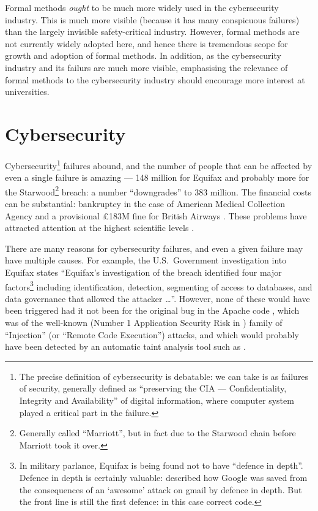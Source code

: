 \documentclass{llncs}
\begin{document}
Formal methods \emph{ought} to be much more widely used in the cybersecurity industry.  This is much more visible (because it has many conspicuous failures) than the largely invisible safety-critical industry. However, formal methods are not currently widely adopted here, and hence there is tremendous scope for growth and adoption of formal methods.
In addition, as the cybersecurity industry and its failurs are much more visible, emphasising the relevance of formal methods to the cybersecurity industry should encourage more interest at universities.

\section{Cybersecurity}
Cybersecurity\footnote{The precise definition of cybersecurity is debatable: we can take is as failures of security, generally defined as ``preserving the CIA --- Confidentiality, Integrity and Availability'' of digital information, where computer system played a critical part in the failure.} failures abound, and the number of people that can be affected by even a single failure is amazing --- 148 million for Equifax \cite{Bloomberg2018b} and probably more for the Starwood\footnote{Generally called ``Marriott'', but in fact due to the Starwood chain before Marriott took it over.} breach: %
a number \cite{Irwin2019b} ``downgrades'' to 383 million.  The financial costs can be substantial: bankruptcy in the case of American Medical Collection Agency \cite{Ford2019b} and a provisional \pounds183M fine for British Airways \cite{Guardian2019i}.  These problems have attracted attention at the highest scientific levels \cite{RoyalSociety2016a}.
\par
There are many reasons for cybersecurity failures, and even a given failure may have multiple causes. For example, the U.S.~Government investigation \cite{GAO2018a} into Equifax states ``Equifax's investigation of the breach identified four major factors\footnote{In military parlance, Equifax is being found not to have ``defence in depth''. Defence in depth is certainly valuable: \cite{Osborne2019d} described how Google was saved from the consequences of an `awesome' attack on gmail by defence in depth. But the front line is still the first defence: in this case correct code.}
including identification, detection, segmenting of access to databases, and data
governance that allowed the attacker \dots''.  However, none of these would have been triggered had it not been for the original bug in the Apache code \cite{Lenart2017a}, which was of the well-known (Number 1 Application Security Risk in \cite{OWASP2017a})  family of ``Injection'' (or ``Remote Code Execution'') attacks, and which would probably have been detected by an automatic taint analysis tool such as \cite{LivshitsLam2005}.
\end{document}
